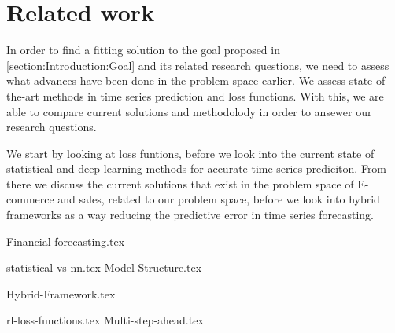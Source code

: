 \chapter{Related work}
\label{section:RelatedWork}

\iffalse
Our problem can be composed into two main categories.
time series forecasting, and e-commerce trend forecasting.
What is the characteristics of e-commerce trend forecasting?
The domain consists of multiple time series, some which correlate.
The time series contains multiple periods, for example users shop
online ofter on sundays than on mondays. 
Some categories are popular in the spring, others in the fall.
Mabye online shopping spikes around common paydays?
\fi


In order to find a fitting solution to the goal proposed in \ref{section:Introduction:Goal} and its related research questions,
we need to assess what advances have been done in the problem space earlier.
We assess state-of-the-art methods in time series prediction and loss functions.
With this, we are able to compare current solutions and methodolody in order to ansewer our research questions.

We start by looking at loss funtions, before we look into the current state of statistical and deep learning methods for accurate time series prediciton.
From there we discuss the current solutions that exist in the problem space of E-commerce and sales, related to our problem space,
before we look into hybrid frameworks as a way reducing the predictive error in time series forecasting.



{Financial-forecasting.tex}

{statistical-vs-nn.tex}
{Model-Structure.tex}

{Hybrid-Framework.tex}

{rl-loss-functions.tex}
{Multi-step-ahead.tex}

